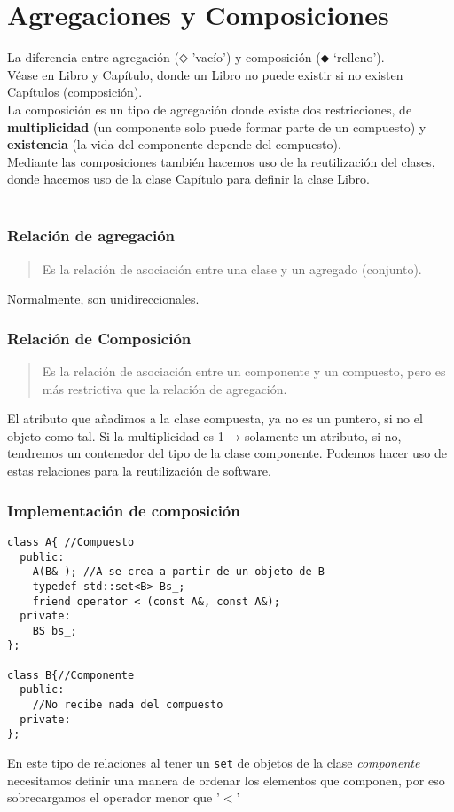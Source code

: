 \chapter{Agregaciones y Composiciones}

La diferencia entre agregación ($⬦$ ’vacío’) y composición ($⬥$ ‘relleno’).\\
Véase en Libro y Capítulo, donde un Libro no puede existir si no existen Capítulos (composición).\\
La composición es un tipo de agregación donde existe dos restricciones, de \textbf{multiplicidad} (un componente solo puede formar parte de un compuesto) y \textbf{existencia} (la vida del componente depende del compuesto).\\
Mediante las composiciones también hacemos uso de la reutilización del clases, donde hacemos uso de la clase Capítulo para definir la clase Libro.\\
\\
\subsection{Relación de agregación}
\begin{quote}
	Es la relación de asociación entre una clase y un agregado (conjunto).
\end{quote}
Normalmente, son unidireccionales.

\subsection{Relación de Composición}
\begin{quote}
	Es la relación de asociación entre un componente y un compuesto, pero es más restrictiva que la relación de agregación.
\end{quote}
El atributo que añadimos a la clase compuesta, ya no es un puntero, si no el objeto como tal.\vspace*{0.2cm}
Si la multiplicidad es 1 → solamente un atributo, si no, tendremos un contenedor del tipo de la clase componente.\vspace*{0.2cm}
Podemos hacer uso de estas relaciones para la reutilización de software.
\newpage
\subsection{ Implementación de composición}
\begin{lstlisting}[frame=single]
class A{ //Compuesto
  public:
  	A(B& ); //A se crea a partir de un objeto de B
    typedef std::set<B> Bs_;
    friend operator < (const A&, const A&);
  private:
    BS bs_;
};

class B{//Componente
  public:
    //No recibe nada del compuesto
  private:
};
\end{lstlisting}
En este tipo de relaciones al tener un \texttt{set} de objetos de la clase \textit{componente} necesitamos definir una manera de ordenar los elementos que componen, por eso sobrecargamos el operador menor que '$<$'
